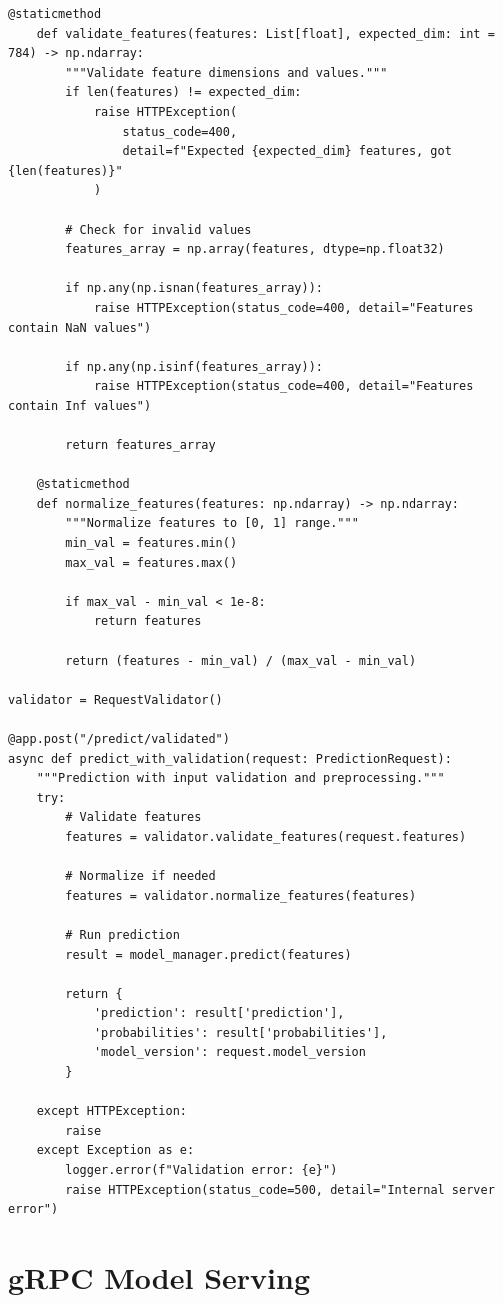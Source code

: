 \begin{lstlisting}[style=python, caption=Advanced serving features with caching and rate limiting]
    @staticmethod
    def validate_features(features: List[float], expected_dim: int = 784) -> np.ndarray:
        """Validate feature dimensions and values."""
        if len(features) != expected_dim:
            raise HTTPException(
                status_code=400,
                detail=f"Expected {expected_dim} features, got {len(features)}"
            )

        # Check for invalid values
        features_array = np.array(features, dtype=np.float32)

        if np.any(np.isnan(features_array)):
            raise HTTPException(status_code=400, detail="Features contain NaN values")

        if np.any(np.isinf(features_array)):
            raise HTTPException(status_code=400, detail="Features contain Inf values")

        return features_array

    @staticmethod
    def normalize_features(features: np.ndarray) -> np.ndarray:
        """Normalize features to [0, 1] range."""
        min_val = features.min()
        max_val = features.max()

        if max_val - min_val < 1e-8:
            return features

        return (features - min_val) / (max_val - min_val)

validator = RequestValidator()

@app.post("/predict/validated")
async def predict_with_validation(request: PredictionRequest):
    """Prediction with input validation and preprocessing."""
    try:
        # Validate features
        features = validator.validate_features(request.features)

        # Normalize if needed
        features = validator.normalize_features(features)

        # Run prediction
        result = model_manager.predict(features)

        return {
            'prediction': result['prediction'],
            'probabilities': result['probabilities'],
            'model_version': request.model_version
        }

    except HTTPException:
        raise
    except Exception as e:
        logger.error(f"Validation error: {e}")
        raise HTTPException(status_code=500, detail="Internal server error")
\end{lstlisting}

\section{gRPC Model Serving}

